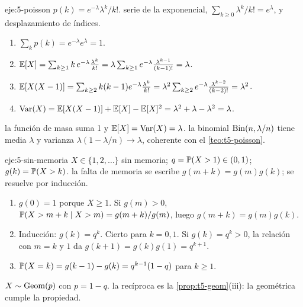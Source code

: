 \begin{solucion}{eje:5-poisson}
\datos $p(k)=e^{-\lambda}\lambda^{k}/k!$.
\planteamiento serie de la exponencial, $\sum_{k\ge0}\lambda^{k}/k!=e^{\lambda}$, y desplazamiento de índices.
\pasos
\begin{enumerate}[label=\arabic*.]
  \item $\sum_kp(k)=e^{-\lambda}e^{\lambda}=1$.
  \item $\mathbb{E}[X]=\sum_{k\ge1}k\,e^{-\lambda}\frac{\lambda^{k}}{k!}=\lambda\sum_{k\ge1}e^{-\lambda}\frac{\lambda^{k-1}}{(k-1)!}=\lambda$.
  \item $\mathbb{E}[X(X-1)]=\sum_{k\ge2}k(k-1)e^{-\lambda}\frac{\lambda^{k}}{k!}=\lambda^{2}\sum_{k\ge2}e^{-\lambda}\frac{\lambda^{k-2}}{(k-2)!}=\lambda^{2}$.
  \item $\operatorname{Var}(X)=\mathbb{E}[X(X-1)]+\mathbb{E}[X]-\mathbb{E}[X]^{2}=\lambda^{2}+\lambda-\lambda^{2}=\lambda$.
\end{enumerate}
\resultado la función de masa suma 1 y $\mathbb{E}[X]=\operatorname{Var}(X)=\lambda$.
\comprobacion la binomial $\operatorname{Bin}(n,\lambda/n)$ tiene media $\lambda$ y varianza $\lambda(1-\lambda/n)\to\lambda$, coherente con el \cref{teo:t5-poisson}.
\end{solucion}

\begin{solucion}{eje:5-sin-memoria}
\datos $X\in\{1,2,\dots\}$ sin memoria; $q=\mathbb{P}(X>1)\in(0,1)$; $g(k)=\mathbb{P}(X>k)$.
\planteamiento la falta de memoria se escribe $g(m+k)=g(m)g(k)$; se resuelve por inducción.
\pasos
\begin{enumerate}[label=\arabic*.]
  \item $g(0)=1$ porque $X\ge1$. Si $g(m)>0$, $\mathbb{P}(X>m+k\mid X>m)=g(m+k)/g(m)$, luego $g(m+k)=g(m)g(k)$.
  \item Inducción: $g(k)=q^{k}$. Cierto para $k=0,1$. Si $g(k)=q^{k}>0$, la relación con $m=k$ y $1$ da $g(k+1)=g(k)g(1)=q^{k+1}$.
  \item $\mathbb{P}(X=k)=g(k-1)-g(k)=q^{k-1}(1-q)$ para $k\ge1$.
\end{enumerate}
\resultado $X\sim\operatorname{Geom}(p)$ con $p=1-q$.
\comprobacion la recíproca es la \cref{prop:t5-geom}(iii): la geométrica cumple la propiedad.
\end{solucion}

